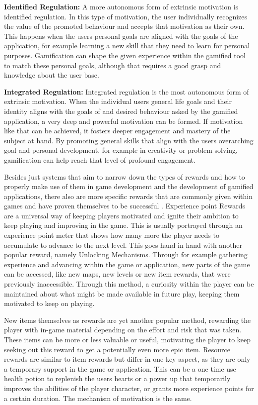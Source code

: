 \textbf{Identified Regulation:}
A more autonomous form of extrinsic motivation is identified regulation. In this type of motivation, the user individually recognizes the value of the promoted behaviour and accepts that motivation as their own. This happens when the users personal goals are aligned with the goals of the application, for example learning a new skill that they need to learn for personal purposes. Gamification can shape the given experience within the gamified tool to match these personal goals, although that requires a good grasp and knowledge about the user base.

\textbf{Integrated Regulation:}
Integrated regulation is the most autonomous form of extrinsic motivation. When the individual users general life goals and their identity aligns with the goals of and desired behaviour asked by the gamified application, a very deep and powerful motivation can be formed. If motivation like that can be achieved, it fosters deeper engagement and mastery of the subject at hand. By promoting general skills that align with the users overarching goal and personal development, for example in creativity or problem-solving, gamification can help reach that level of profound engagement.

Besides just systems that aim to narrow down the types of rewards and how to properly make use of them in game development and the development of gamified applications, there also are more specific rewards that are commonly given within games and have proven themselves to be successful \cite{mmo}.
Experience point Rewards are a universal way of keeping players motivated and ignite their ambition to keep playing and improving in the game. This is usually portrayed through an experience point meter that shows how many more the player needs to accumulate to advance to the next level. This goes hand in hand with another popular reward, namely Unlocking Mechanisms. Through for example gathering experience and advancing within the game or application, new parts of the game can be accessed, like new maps, new levels or new item rewards, that were previously inaccessible. Through this method, a curiosity within the player can be maintained about what might be made available in future play, keeping them motivated to keep on playing.

New items themselves as rewards are yet another popular method, rewarding the player with in-game material depending on the effort and risk that was taken. These items can be more or less valuable or useful, motivating the player to keep seeking out this reward to get a potentially even more epic item.
Resource rewards are similar to item rewards but differ in one key aspect, as they are only a temporary support in the game or application. This can be a one time use health potion to replenish the users hearts or a power up that temporarily improves the abilities of the player character, or grants more experience points for a certain duration. The mechanism of motivation is the same.

